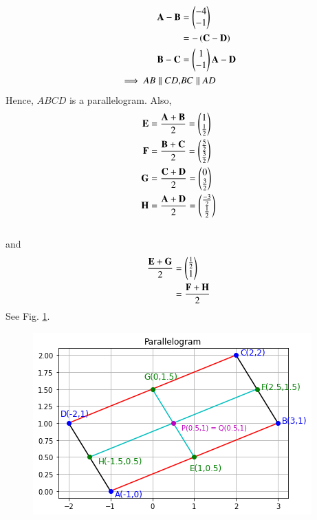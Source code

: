 \begin{align}
    \mathbf{A} - \mathbf{B} &=  \begin{pmatrix}-4\\-1\end{pmatrix}
    \label{AB}
    \\
    &= -\left(\mathbf{C} - \mathbf{D}\right)
    \\
\mathbf{B} - \mathbf{C} &=
    \begin{pmatrix}1\\-1\end{pmatrix}
    \mathbf{A} - \mathbf{D} 
    \label{AD}
    \\
    \implies AB \parallel CD,  & BC \parallel AD 
\end{align}
Hence, $ABCD$ is a parallelogram.  Also, 
%
\begin{align}
    \mathbf{E} &= \frac{\mathbf{A} + \mathbf{B}}{2} =   \begin{pmatrix}1\\\frac{1}{2}\end{pmatrix}
    \\
    \mathbf{F} &= \frac{\mathbf{B} + \mathbf{C}}{2} =   \begin{pmatrix}\frac{5}{2}\\\frac{3}{2}\end{pmatrix}
    \\
    \mathbf{G} &= \frac{\mathbf{C} + \mathbf{D}}{2} = \begin{pmatrix}0\\\frac{3}{2}\end{pmatrix}
\\
\mathbf{H} &= \frac{\mathbf{A} + \mathbf{D}}{2} =   \begin{pmatrix}\frac{-3}{2}\\\frac{1}{2}\end{pmatrix}
\end{align}\\
and 
\begin{align}
 \frac{\mathbf{E} + \mathbf{G}}{2} &=   \begin{pmatrix}\frac{1}{2}\\1\end{pmatrix}\\
 & = \frac{\mathbf{F} + \mathbf{H}}{2} 
\end{align}
See Fig. \ref{fig;ramsey/1/1/9}.
 \begin{figure}[!ht]
 \centering
 \includegraphics[width=\columnwidth]{solutions/1/1/9/parallelogram.png}
 \caption{}
 \label{fig;ramsey/1/1/9}
 \end{figure}

